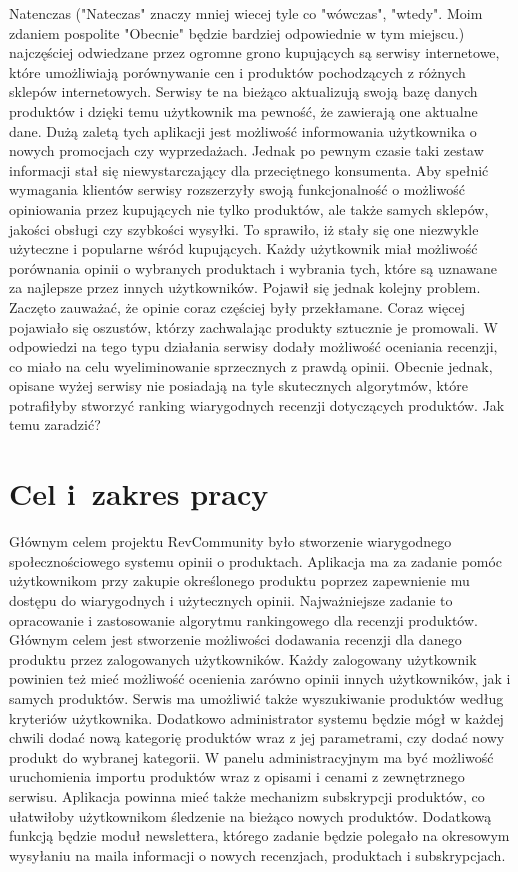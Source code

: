 Natenczas ("Nateczas" znaczy mniej wiecej tyle co "wówczas", "wtedy". Moim zdaniem pospolite "Obecnie" będzie bardziej odpowiednie w tym miejscu.) najczęściej odwiedzane przez ogromne grono kupujących są serwisy internetowe, które umożliwiają porównywanie cen i produktów pochodzących z różnych sklepów internetowych. Serwisy te na bieżąco aktualizują swoją bazę danych produktów i dzięki temu użytkownik ma pewność, że zawierają one aktualne dane. Dużą zaletą tych aplikacji jest możliwość informowania użytkownika o nowych promocjach czy wyprzedażach. Jednak po pewnym czasie taki zestaw informacji stał się niewystarczający dla przeciętnego konsumenta. Aby spełnić wymagania klientów serwisy rozszerzyły swoją funkcjonalność o możliwość opiniowania przez kupujących nie tylko produktów, ale także samych sklepów, jakości obsługi czy szybkości wysyłki. To sprawiło, iż stały się one niezwykle użyteczne i popularne wśród kupujących. Każdy użytkownik miał możliwość porównania opinii o wybranych produktach i wybrania tych, które są uznawane za najlepsze przez innych użytkowników. Pojawił się jednak kolejny problem. Zaczęto zauważać, że opinie coraz częściej były przekłamane. Coraz więcej pojawiało się oszustów, którzy zachwalając produkty sztucznie je promowali. W odpowiedzi na tego typu działania serwisy dodały możliwość oceniania recenzji, co miało na celu wyeliminowanie sprzecznych z prawdą opinii. Obecnie jednak, opisane wyżej serwisy nie posiadają na tyle skutecznych algorytmów, które potrafiłyby stworzyć ranking wiarygodnych recenzji dotyczących produktów. Jak temu zaradzić?  
 


\section{Cel i~zakres pracy}
Głównym celem projektu RevCommunity było stworzenie wiarygodnego społecznościowego systemu  opinii o produktach. Aplikacja ma za zadanie pomóc użytkownikom przy zakupie określonego produktu poprzez zapewnienie mu dostępu do wiarygodnych i użytecznych opinii. Najważniejsze zadanie to opracowanie i zastosowanie algorytmu rankingowego dla recenzji produktów. Głównym celem jest stworzenie możliwości dodawania recenzji dla danego produktu przez zalogowanych użytkowników. Każdy zalogowany użytkownik powinien też mieć możliwość ocenienia zarówno opinii innych użytkowników, jak i samych produktów. Serwis ma umożliwić także wyszukiwanie produktów według kryteriów użytkownika. Dodatkowo administrator systemu będzie mógł w każdej chwili dodać nową kategorię produktów wraz z jej parametrami, czy dodać nowy produkt do wybranej kategorii. W panelu administracyjnym ma być możliwość uruchomienia importu produktów wraz z opisami i cenami z zewnętrznego serwisu. Aplikacja powinna mieć także mechanizm subskrypcji produktów, co ułatwiłoby użytkownikom śledzenie na bieżąco nowych produktów. Dodatkową funkcją będzie moduł newslettera, którego zadanie będzie polegało na okresowym wysyłaniu na maila informacji o nowych recenzjach, produktach i subskrypcjach. 


